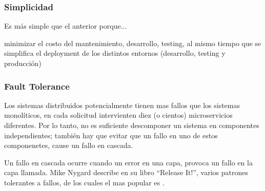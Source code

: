 
\subsubsection{Simplicidad}

Es más simple que el anterior porque...

minimizar el costo del mantenimiento, desarrollo, testing, al mismo tiempo que se simplifica el deployment de los distintos entornos (desarrollo, testing y producción)

\subsubsection{Fault Tolerance}

Los sistemas distribuidos potencialmente tienen mas fallos que los sistemas monolíticos, en cada solicitud intervienten diez (o cientos) microservicios diferentes.\cite[p.~48]{stin2015}  Por lo tanto, no es suficiente descomponer un sistema en componentes  independientes; también hay que evitar que un fallo en uno de estos componenetes, cause un fallo en cascada.\cite[p.~4]{stin2015}

Un fallo en cascada ocurre cuando un error en una capa, provoca un fallo en la capa llamada.\cite[p.~65]{nygard2007}  Mike Nygard describe en su libro ``Release It!''\cite{nygard2007}, varios patrones tolerantes a fallos, de los cuales el mas popular es .

